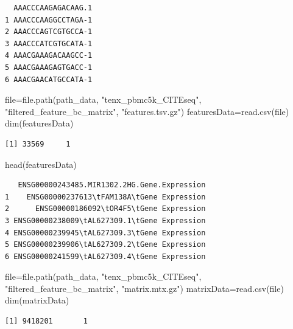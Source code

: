 \documentclass[
  letterpaper,
  DIV=11,
  numbers=noendperiod]{scrartcl}
\newenvironment{Shaded}{\begin{snugshade}}{\end{snugshade}}
\newcommand{\FunctionTok}[1]{\textcolor[rgb]{0.28,0.35,0.67}{#1}}
\newcommand{\NormalTok}[1]{\textcolor[rgb]{0.00,0.23,0.31}{#1}}
\newcommand{\OtherTok}[1]{\textcolor[rgb]{0.00,0.23,0.31}{#1}}
\newcommand{\StringTok}[1]{\textcolor[rgb]{0.13,0.47,0.30}{#1}}
\begin{document}
\begin{verbatim}
  AAACCCAAGAGACAAG.1
1 AAACCCAAGGCCTAGA-1
2 AAACCCAGTCGTGCCA-1
3 AAACCCATCGTGCATA-1
4 AAACGAAAGACAAGCC-1
5 AAACGAAAGAGTGACC-1
6 AAACGAACATGCCATA-1
\end{verbatim}

\begin{Shaded}
\begin{Highlighting}[]
\NormalTok{file}\OtherTok{=}\FunctionTok{file.path}\NormalTok{(path\_data, }\StringTok{"tenx\_pbmc5k\_CITEseq"}\NormalTok{, }\StringTok{"filtered\_feature\_bc\_matrix"}\NormalTok{, }\StringTok{"features.tsv.gz"}\NormalTok{)}
\NormalTok{featuresData}\OtherTok{=}\FunctionTok{read.csv}\NormalTok{(file)}
\FunctionTok{dim}\NormalTok{(featuresData)}
\end{Highlighting}
\end{Shaded}

\begin{verbatim}
[1] 33569     1
\end{verbatim}

\begin{Shaded}
\begin{Highlighting}[]
\FunctionTok{head}\NormalTok{(featuresData)}
\end{Highlighting}
\end{Shaded}

\begin{verbatim}
   ENSG00000243485.MIR1302.2HG.Gene.Expression
1    ENSG00000237613\tFAM138A\tGene Expression
2      ENSG00000186092\tOR4F5\tGene Expression
3 ENSG00000238009\tAL627309.1\tGene Expression
4 ENSG00000239945\tAL627309.3\tGene Expression
5 ENSG00000239906\tAL627309.2\tGene Expression
6 ENSG00000241599\tAL627309.4\tGene Expression
\end{verbatim}

\begin{Shaded}
\begin{Highlighting}[]
\NormalTok{file}\OtherTok{=}\FunctionTok{file.path}\NormalTok{(path\_data, }\StringTok{"tenx\_pbmc5k\_CITEseq"}\NormalTok{, }\StringTok{"filtered\_feature\_bc\_matrix"}\NormalTok{, }\StringTok{"matrix.mtx.gz"}\NormalTok{)}
\NormalTok{matrixData}\OtherTok{=}\FunctionTok{read.csv}\NormalTok{(file)}
\FunctionTok{dim}\NormalTok{(matrixData)}
\end{Highlighting}
\end{Shaded}

\begin{verbatim}
[1] 9418201       1
\end{verbatim}
\end{document}

